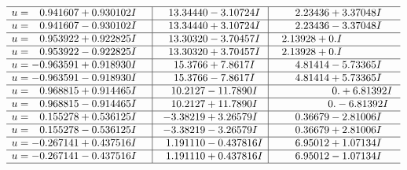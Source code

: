 \documentclass[1p]{elsarticle_modified}
\theoremstyle{definition}
\begin{document}
$$\begin{array}{c|c|c}
 \hline 
\begin{aligned}
u &= \phantom{-}0.941607 + 0.930102 I\end{aligned}
 & \phantom{-}13.34440 - 3.10724 I & \phantom{-}2.23436 + 3.37048 I \\ \hline\begin{aligned}
u &= \phantom{-}0.941607 - 0.930102 I\end{aligned}
 & \phantom{-}13.34440 + 3.10724 I & \phantom{-}2.23436 - 3.37048 I \\ \hline\begin{aligned}
u &= \phantom{-}0.953922 + 0.922825 I\end{aligned}
 & \phantom{-}13.30320 - 3.70457 I & \phantom{-}2.13928 + 0. I\phantom{ +0.000000I} \\ \hline\begin{aligned}
u &= \phantom{-}0.953922 - 0.922825 I\end{aligned}
 & \phantom{-}13.30320 + 3.70457 I & \phantom{-}2.13928 + 0. I\phantom{ +0.000000I} \\ \hline\begin{aligned}
u &= -0.963591 + 0.918930 I\end{aligned}
 & \phantom{-}15.3766 + 7.8617 I & \phantom{-}4.81414 - 5.73365 I \\ \hline\begin{aligned}
u &= -0.963591 - 0.918930 I\end{aligned}
 & \phantom{-}15.3766 - 7.8617 I & \phantom{-}4.81414 + 5.73365 I \\ \hline\begin{aligned}
u &= \phantom{-}0.968815 + 0.914465 I\end{aligned}
 & \phantom{-}10.2127 - 11.7890 I & \phantom{-0.000000 -}0. + 6.81392 I \\ \hline\begin{aligned}
u &= \phantom{-}0.968815 - 0.914465 I\end{aligned}
 & \phantom{-}10.2127 + 11.7890 I & \phantom{-0.000000 } 0. - 6.81392 I \\ \hline\begin{aligned}
u &= \phantom{-}0.155278 + 0.536125 I\end{aligned}
 & -3.38219 + 3.26579 I & \phantom{-}0.36679 - 2.81006 I \\ \hline\begin{aligned}
u &= \phantom{-}0.155278 - 0.536125 I\end{aligned}
 & -3.38219 - 3.26579 I & \phantom{-}0.36679 + 2.81006 I \\ \hline\begin{aligned}
u &= -0.267141 + 0.437516 I\end{aligned}
 & \phantom{-}1.191110 - 0.437816 I & \phantom{-}6.95012 + 1.07134 I \\ \hline\begin{aligned}
u &= -0.267141 - 0.437516 I\end{aligned}
 & \phantom{-}1.191110 + 0.437816 I & \phantom{-}6.95012 - 1.07134 I\\
 \hline 
 \end{array}$$\newpage
\end{document}
